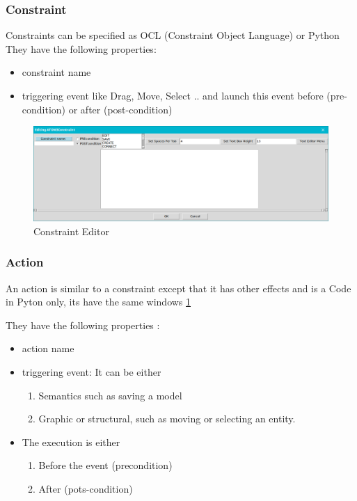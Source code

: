 \subsubsection{ Constraint }

Constraints can be specified as OCL (Constraint Object Language) or Python
They have the following properties: 
\begin{itemize}
\newcommand{\localtextbulletone}{\textcolor{gray}{\raisebox{.45ex}{\rule{.6ex}{.6ex}}}}
\renewcommand{\labelitemi}{\localtextbulletone}
\item  constraint name
\item  triggering event  like Drag, Move, Select ..
and launch this event before (pre-condition) or after (post-condition)
 
\end{itemize}
 

\begin{figure}[th]
	\centering
	\includegraphics[scale=0.37]{ch3/img/const}
	\caption{\label{fig:Constraint Editor}Constraint Editor}
\end{figure} 
\subsubsection{ Action }

An action is similar to a constraint except that it has other effects and is a
Code in Pyton only, its have the same windows \ref{fig:Constraint Editor} 

They have the following properties :
\begin{itemize}
\newcommand{\localtextbulletone}{\textcolor{gray}{\raisebox{.45ex}{\rule{.6ex}{.6ex}}}}
\renewcommand{\labelitemi}{\localtextbulletone}
\item action name
\item triggering event: It can be either
	\begin{enumerate}
	\item Semantics such as saving a model
	\item Graphic or structural, such as moving or selecting an entity.
	\end{enumerate}
	
\item The execution is either
	\begin{enumerate}
	\item Before the event (precondition)
	\item  After (pots-condition) 
	\end{enumerate}

\end{itemize}
 


